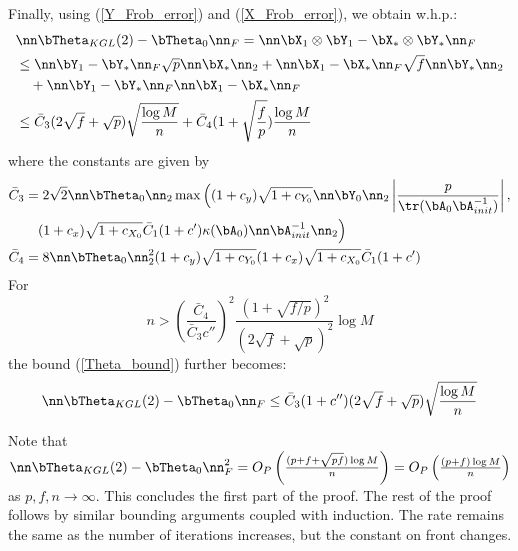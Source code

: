 \begin{IEEEproof}
Finally, using (\ref{Y_Frob_error}) and (\ref{X_Frob_error}), we obtain w.h.p.:
\begin{align}
	& \nn \bTheta_{KGL}(2)-\bTheta_0 \nn_F = \nn \bX_1 \otimes \bY_1 - \bX_* \otimes \bY_* \nn_F \nonumber \\
		&\leq \nn \bY_1-\bY_*\nn_F \sqrt{p} \nn \bX_*\nn_2 + \nn \bX_1-\bX_*\nn_F \sqrt{f} \nn \bY_*\nn_2 \nonumber \\
		&\quad + \nn \bY_1-\bY_*\nn_F \nn \bX_1-\bX_*\nn_F \nonumber \\
		&\leq \bar{C}_3 (2\sqrt{f}+\sqrt{p}) \sqrt{\frac{\log M}{n}} + \bar{C}_4 (1+\sqrt{\frac{f}{p}}) \frac{\log M}{n} \label{Theta_bound}
\end{align}
where the constants are given by
\begin{align*}
	\bar{C}_3 &= 2\sqrt{2} \nn \bTheta_0\nn_2 \max\Big((1+c_y)\sqrt{1+c_{Y_0}} \nn\bY_0\nn_2\left|\frac{p}{\tr(\bA_0\bA_{init}^{-1})}\right|, \\
		&\quad (1+c_x)\sqrt{1+c_{X_0}} \bar{C}_1(1+c') \kappa(\bA_0) \nn\bA_{init}^{-1}\nn_2 \Big) \\
	\bar{C}_4 &= 8 \nn\bTheta_0\nn_2^2 (1+c_y)\sqrt{1+c_{Y_0}} (1+c_x)\sqrt{1+c_{X_0}} \bar{C}_1 (1+c')
\end{align*}
For
\begin{equation}
	n>(\frac{\bar{C}_4}{\bar{C}_3 c''})^2 \frac{(1+\sqrt{f/p})^2}{(2\sqrt{f}+\sqrt{p})^2} \log M
\end{equation}
the bound (\ref{Theta_bound}) further becomes:
\begin{equation*}
	\nn \bTheta_{KGL}(2)-\bTheta_0 \nn_F \leq \bar{C}_3 (1+c'') (2\sqrt{f}+\sqrt{p}) \sqrt{\frac{\log M}{n}}
\end{equation*}

Note that $\nn \bTheta_{KGL}(2)-\bTheta_0 \nn_F^2 = O_P\left( \frac{ (p+f+\sqrt{pf}) \log M}{n} \right) =  O_P\left( \frac{ (p+f) \log M}{n} \right)$ as $p,f,n\to\infty$. This concludes the first part of the proof. The rest of the proof follows by similar bounding arguments coupled with induction. The rate remains the same as the number of iterations increases, but the constant on front changes.


\end{IEEEproof}
